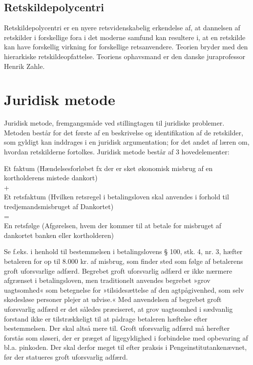 \documentclass[]{book}
\begin{document}
\hypertarget{retskildepolycentri}{%
\subsection{Retskildepolycentri}\label{retskildepolycentri}}

Retskildepolycentri er en nyere retsvidenskabelig erkendelse af, at dannelsen af retskilder i forskellige fora i det moderne samfund kan resultere i, at en retskilde kan have forskellig virkning for forskellige retsanvendere. Teorien bryder med den hierarkiske retskildeopfattelse. Teoriens ophavsmand er den danske juraprofessor Henrik Zahle.

\hypertarget{juridisk-metode}{%
\section{Juridisk metode}\label{juridisk-metode}}

Juridisk metode, fremgangsmåde ved stillingtagen til juridiske problemer. Metoden består for det første af en beskrivelse og identifikation af de retskilder, som gyldigt kan inddrages i en juridisk argumentation; for det andet af læren om, hvordan retskilderne fortolkes. Juridisk metode består af 3 hovedelementer:

Et faktum (Hændelsesforløbet fx der er sket økonomisk misbrug af en kortholderens mistede dankort)\\
+\\
Et retsfaktum (Hvilken retsregel i betalingsloven skal anvendes i forhold til tredjemandsmisbruget af Dankortet)\\
=\\
En retsfølge (Afgørelsen, hvem der kommer til at betale for misbruget af dankortet banken eller kortholderen)

Se f.eks. i henhold til bestemmelsen i betalingslovens § 100, stk. 4, nr. 3, hæfter betaleren for op til 8.000 kr. af misbrug, som finder sted som følge af betalerens groft uforsvarlige adfærd.
Begrebet groft uforsvarlig adfærd er ikke nærmere afgrænset i betalingsloven, men traditionelt anvendes begrebet »grov uagtsomhed« som betegnelse for »tilsidesættelse af den agtpågivenhed, som selv skødesløse personer plejer at udvise.« Med anvendelsen af begrebet groft uforsvarlig adfærd er det således præciseret, at grov uagtsomhed i sædvanlig forstand ikke er tilstrækkeligt til at pådrage betaleren hæftelse efter bestemmelsen. Der skal altså mere til. Groft uforsvarlig adfærd må herefter forstås som sløseri, der er præget af ligegyldighed i forbindelse med opbevaring af bl.a. pinkoden. Der skal derfor meget til efter praksis i Pengeinstitutankenævnet, før der statueres groft uforsvarlig adfærd.
\end{document}
